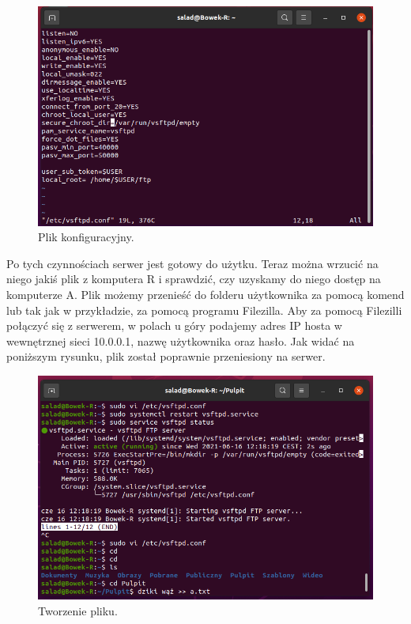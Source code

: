 \documentclass{article}
\begin{document}
\begin{figure}[H]
    \centering
    \includegraphics[scale = 0.65]{ftp/ftp_conf.png}  
    \caption{Plik konfiguracyjny.}
    \label{5}
\end{figure}
\justify
Po tych czynnościach serwer jest gotowy do użytku. Teraz można wrzucić na niego jakiś plik z komputera R i sprawdzić, czy uzyskamy do niego dostęp na komputerze A. Plik możemy przenieść do folderu użytkownika za pomocą komend lub tak jak w przykładzie, za pomocą programu Filezilla. Aby za pomocą Filezilli połączyć się z serwerem, w polach u góry podajemy adres IP hosta w wewnętrznej sieci 10.0.0.1, nazwę użytkownika oraz hasło. Jak widać na poniższym rysunku, plik został poprawnie przeniesiony na serwer.
\newpage
\begin{figure}[H]
    \centering
    \includegraphics[scale = 0.7]{ftp/running.png}  
    \caption{Tworzenie pliku.}
    \label{5}
\end{figure}
\end{document}
